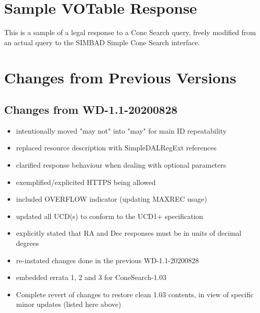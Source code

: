 \documentclass[11pt,a4paper]{ivoa}
\begin{document}
\appendix

\section{Sample VOTable Response}
\label{appendix:a}

This is a sample of a legal response to a Cone Search query, freely modified
from an actual query to the SIMBAD Simple Cone Search interface.



\section{Changes from Previous Versions}

\subsection*{Changes from WD-1.1-20200828}
\begin{itemize}
	\item intentionally moved "may not" into "may" for main ID repeatability
	\item replaced resource description with SimpleDALRegExt references
	\item clarified response behaviour when dealing with optional
parameters
	\item exemplified/explicited HTTPS being allowed
	\item included OVERFLOW indicator (updating MAXREC usage)
	\item updated all UCD(s) to conform to the UCD1+ specification
	\item explicitly stated that RA and Dec responses must be
		in units of decimal degrees
	\item re-instated changes done in the previous WD-1.1-20200828
	\item embedded errata 1, 2 and 3 for ConeSearch-1.03
	\item Complete revert of changes to restore clean 1.03 contents,
		in view of specific minor updates (listed here above)
\end{itemize}
\end{document}
